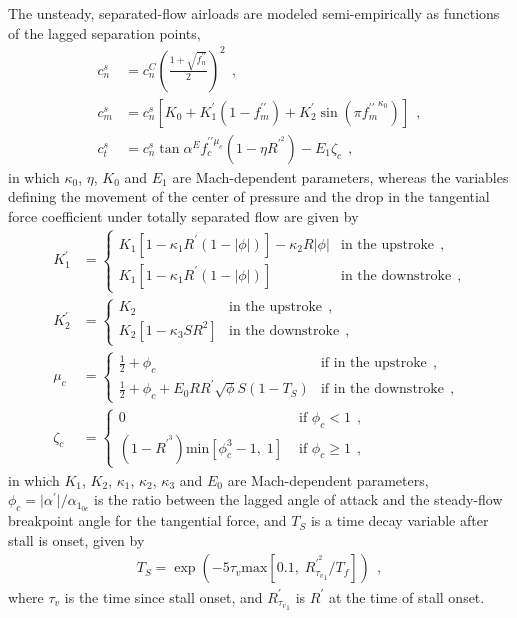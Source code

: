 \documentclass[12pt,a4paper,oneside,english]{abntex2} %
\newcommand{\abs}[1]{\lvert#1\rvert}
\def\lb{\left[}
\def\rb{\right]}
\def\lp{\left(}
\def\rp{\right)}
\def\alphalag{\alpha^\prime}
\begin{document}
The unsteady, separated-flow airloads are modeled semi-empirically as functions of the lagged separation points,
\begin{align}
    c_n^s &= c_n^C\lp\frac{1+\sqrt{ f_n^{\prime\prime}}}{2}\rp^2 \ \ ,
    \label{eq:cns} 
    \\
    c_m^s &= c_n^s\lb K_0+K_1^{\prime}\lp1-f_m^{\prime\prime}\rp+K_2^{\prime}\sin\lp\pi {f_m^{\prime\prime}}^{\kappa_0}\rp\rb \ \ ,
    \label{eq:cms} 
    \\
    c_t^s &= c_n^s\tan\alpha^E f_c^{\prime\prime\mu_c}\lp1-\eta R^{\prime^2}\rp-E_1\zeta_c \ \ ,
    \label{eq:cts}	
\end{align} 
in which $\kappa_0$, $\eta$, $K_0$ and $E_1$ are Mach-dependent parameters, whereas the variables defining the movement of the center of pressure and the drop in the tangential force coefficient under totally separated flow are given by
\begin{align}
    K_1^{\prime} &=	
    \begin{cases}
    K_1\lb1-\kappa_1R^{\prime}(1-\abs{\phi})\rb - \kappa_2R\abs{\phi} &\text{in the upstroke} \ \ ,
    \\
    K_1\lb1-\kappa_1R^{\prime}(1-\abs{\phi})\rb&\text{in the downstroke} \ \ ,
    \end{cases}
    \label{eq:K1_prime} 
    \\
    K_2^{\prime} &=	
    \begin{cases}
    K_2 &\text{in the upstroke} \ \ ,
    \\
    K_2\lb1-\kappa_3SR^2\rb&\text{in the downstroke} \ \ ,
    \end{cases}
    \label{eq:K2_prime}
    \\
    \mu_c &= 
    \begin{cases}
    \frac{1}{2} + \phi_c &\text{if in the upstroke} \ \ ,
    \\
    \frac{1}{2} + \phi_c + E_0RR^\prime\sqrt{\phi}S\lp1-T_S\rp &\text{if in the downstroke} \ \ ,
    \end{cases}
    \label{eq:mu_c}
    \\
    \zeta_c &= 
    \begin{cases}
    0 &\text{ if } \phi_c < 1 \ \ ,
    \\
    \lp1-R^{\prime^3}\rp\text{min}\lb\phi_c^3-1,\;1\rb &\text{ if } \phi_c \geq 1 \ \ ,
    \end{cases}
    \label{eq:zeta_c}
\end{align}
in which $K_1$, $K_2$, $\kappa_1$, $\kappa_2$, $\kappa_3$ and $E_0$ are Mach-dependent parameters, $\phi_c = \abs{\alphalag}/\alpha_{1_{0c}}$ is the ratio between the lagged angle of attack and the steady-flow breakpoint angle for the tangential force, and $T_S$ is a time decay variable after stall is onset, given by
\begin{align}
    T_S = \exp\lp -5\tau_v \text{max} \lb 0.1, \; R^{\prime^2}_{{\tau_v}_1}/T_f \rb \rp \ \ ,
    \label{eq:T_S}
\end{align}
where $\tau_v$ is the time since stall onset, and $R^{\prime}_{{\tau_v}_1}$ is $R^{\prime}$ at the time of stall onset. 
\end{document}
